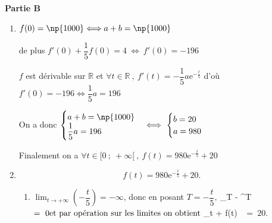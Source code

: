 \documentclass[11pt,a4paper,answers,fancyhdr]{exam}
\newcommand{\equi}{\Longleftrightarrow}
\newcommand{\R}{\mathbb{R}}
\renewcommand{\exp}[1]{\text{e}^{#1}}
\newcommand{\Lim}[3]{$\displaystyle \lim_{#1 \to #2} #3~$}
\begin{document}
\bigskip

\textbf{Partie B}

\medskip

%
%
%
%

\begin{enumerate}
\item %

\begin{solution}
$f(0) = \np{1000}\equi a+b=\np{1000}$

de plus $f'(0)+\dfrac{1}{5}f(0)=4~\equi~f'(0)=-196$

$f$ est dérivable sur $\R$ et $\forall t \in \R~,~f'(t)=- \dfrac{1}{5}a\text{e}^{- \frac{t}{5}}$ d'où $f'(0)=-196 \equi \dfrac{1}{5}a = 196$

On a donc $\begin{cases}
a+b=\np{1000}\\\dfrac{1}{5}a=196
\end{cases}\equi~
\begin{cases}
b=20\\a=980
\end{cases}$

Finalement on a $\forall t \in [0~;~+\infty[~,~f(t)=980\text{e}^{- \frac{t}{5}} + 20$
\end{solution}

\item %

\[f(t) = 980\text{e}^{- \frac{t}{5}} + 20.\]

\medskip

	\begin{enumerate}
		\item %
		
		\begin{solution}
$\displaystyle\lim_{t \to +\infty}\left( - \dfrac{t}{5}\right) = - \infty$, donc en posant $T = -\dfrac{t}{5}, 
\: \Lim{T}{-\infty}{\exp{T}}=~0\: \\\text{et par opération sur les limites on obtient} \:\Lim{t}{+\infty}{f(t) }=~20$.
		\end{solution}
		

\end{enumerate}
\end{enumerate}
\end{document}
